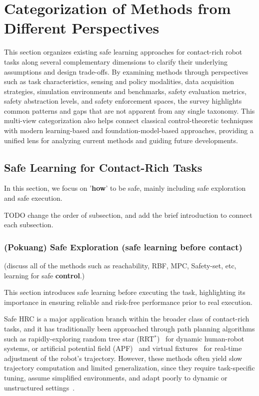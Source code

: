 \documentclass[Afour,sageh,times]{template/sagej}
\newcommand{\suggest}[1]{{\color{olive} (#1)}}
\newcommand{\highlight}[1]{{\color{violet} #1}}
\begin{document}
\section{Categorization of Methods from Different Perspectives} \label{sec:methods}
This section organizes existing safe learning approaches for contact-rich robot tasks along several complementary dimensions to clarify their underlying assumptions and design trade-offs. By examining methods through perspectives such as task characteristics, sensing and policy modalities, data acquisition strategies, simulation environments and benchmarks, safety evaluation metrics, safety abstraction levels, and safety enforcement spaces, the survey highlights common patterns and gaps that are not apparent from any single taxonomy. This multi-view categorization also helps connect classical control-theoretic techniques with modern learning-based and foundation-model-based approaches, providing a unified lens for analyzing current methods and guiding future developments.
\subsection{Safe Learning for Contact-Rich Tasks}
\highlight{In this section, we focus on '\textbf{how}' to be safe, mainly including safe exploration and safe execution.}

{\color{red} TODO change the order of subsection, and add the brief introduction to connect each subsection.}

\subsubsection{\suggest{Pokuang} Safe Exploration (safe learning before contact)}
\suggest{discuss all of the methods such as reachability, RBF, MPC, Safety-set, etc, learning for safe \textbf{control}.}

This section introduces safe learning before executing the task, highlighting its importance in ensuring reliable and risk-free performance prior to real execution. 

Safe HRC is a major application branch within the broader class of contact-rich tasks, and it has traditionally been approached through path planning algorithms such as rapidly-exploring random tree star (RRT$^*$)~\cite{chi2017risk} for dynamic human-robot systems, or artificial potential field (APF)~\cite{rodriguez2023advanced} and virtual fixtures~\cite{bowyer2013active} for real-time adjustment of the robot's trajectory. 
However, these methods often yield slow trajectory computation and limited generalization, since they require task-specific tuning, assume simplified environments, and adapt poorly to dynamic or unstructured settings~\cite{bowyer2013active}.
\end{document}
